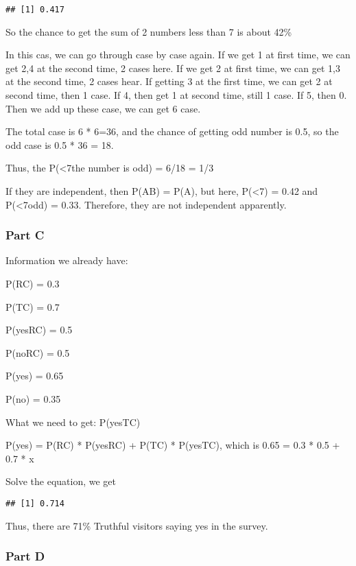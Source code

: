 \documentclass[
]{article}
\begin{document}
\begin{verbatim}
## [1] 0.417
\end{verbatim}

So the chance to get the sum of 2 numbers less than 7 is about 42\%

In this cas, we can go through case by case again. If we get 1 at first time, we can get 2,4 at the second time, 2 cases here. If we get 2 at first time, we can get 1,3 at the second time, 2 cases hear. If getting 3 at the first time, we can get 2 at second time, then 1 case. If 4, then get 1 at second time, still 1 case. If 5, then 0. Then we add up these case, we can get 6 case.

The total case is 6 * 6=36, and the chance of getting odd number is 0.5, so the odd case is 0.5 * 36 = 18.

Thus, the P(\textless7\textbar the number is odd) = 6/18 = 1/3

If they are independent, then P(A\textbar B) = P(A), but here, P(\textless7) = 0.42 and P(\textless7\textbar odd) = 0.33. Therefore, they are not independent apparently.

\hypertarget{part-c-3}{%
\subsubsection{Part C}\label{part-c-3}}

Information we already have:

P(RC) = 0.3

P(TC) = 0.7

P(yes\textbar RC) = 0.5

P(no\textbar RC) = 0.5

P(yes) = 0.65

P(no) = 0.35

What we need to get: P(yes\textbar TC)

P(yes) = P(RC) * P(yes\textbar RC) + P(TC) * P(yes\textbar TC), which is 0.65 = 0.3 * 0.5 + 0.7 * x

Solve the equation, we get

\begin{verbatim}
## [1] 0.714
\end{verbatim}

Thus, there are 71\% Truthful visitors saying yes in the survey.

\hypertarget{part-d-1}{%
\subsubsection{Part D}\label{part-d-1}}
\end{document}
